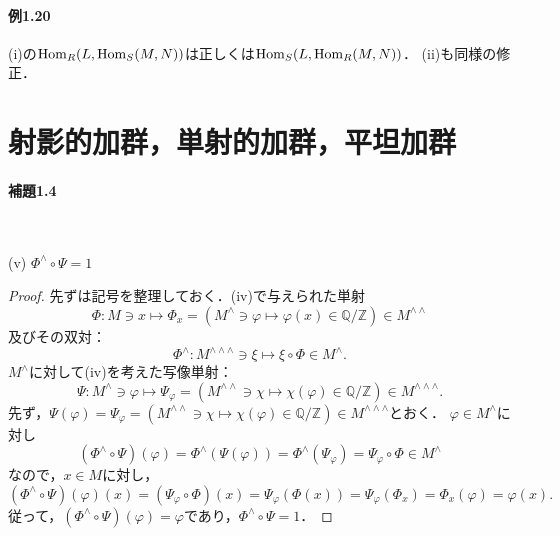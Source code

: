 \paragraph{例1.20}
(i)の$\operatorname{Hom}_R(L, \operatorname{Hom}_S(M ,N))$は正しくは$\operatorname{Hom}_S(L, \operatorname{Hom}_R(M ,N))$．
(ii)も同様の修正．

\section{射影的加群，単射的加群，平坦加群}
\paragraph{補題1.4}~
\begin{screen}
  (v) $\Phi^\wedge \circ \Psi = 1$
\end{screen}
\begin{proof}
  先ずは記号を整理しておく．(iv)で与えられた単射
  \[ \Phi \colon M \ni x \mapsto \Phi_x = (M^\wedge \ni \varphi \mapsto \varphi(x) \in \mathbb{Q}/\mathbb{Z}) \in M^{\wedge\wedge} \]
  及びその双対：
  \[\Phi^\wedge \colon M^{\wedge\wedge\wedge} \ni \xi \mapsto \xi \circ \Phi \in M^\wedge.\]
  $M^\wedge$に対して(iv)を考えた写像単射：
  \[ \Psi \colon M^\wedge \ni \varphi \mapsto \Psi_\varphi = (M^{\wedge\wedge} \ni \chi \mapsto \chi(\varphi) \in \mathbb{Q}/\mathbb{Z}) \in M^{\wedge\wedge\wedge}. \]
  先ず，$\Psi(\varphi) = \Psi_\varphi = (M^{\wedge\wedge} \ni \chi \mapsto \chi(\varphi) \in \mathbb{Q}/\mathbb{Z}) \in M^{\wedge\wedge\wedge}$とおく．
  $\varphi \in M^\wedge$に対し
  \[ (\Phi^\wedge \circ \Psi)(\varphi) = \Phi^\wedge(\Psi(\varphi)) = \Phi^\wedge(\Psi_\varphi) = \Psi_\varphi \circ \Phi \in M^\wedge\]
  なので，$x \in M$に対し，
  \[ (\Phi^\wedge \circ \Psi)(\varphi)(x) = (\Psi_\varphi \circ \Phi)(x) = \Psi_\varphi(\Phi(x)) = \Psi_\varphi(\Phi_x) = \Phi_x(\varphi) = \varphi(x). \]
  従って，$(\Phi^\wedge \circ \Psi)(\varphi) = \varphi$であり，$\Phi^\wedge \circ \Psi = 1$．
\end{proof}

